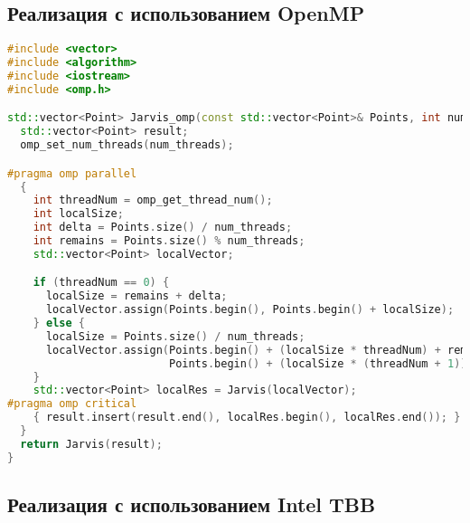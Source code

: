 \documentclass[]{article}
\theoremstyle{remark}
\theoremstyle{definition}
\begin{document}
\subsection{Реализация с использованием OpenMP}

\begin{lstlisting}[language=C++]
#include <vector>
#include <algorithm>
#include <iostream>
#include <omp.h>

std::vector<Point> Jarvis_omp(const std::vector<Point>& Points, int num_threads) {
  std::vector<Point> result;
  omp_set_num_threads(num_threads);

#pragma omp parallel
  {
    int threadNum = omp_get_thread_num();
    int localSize;
    int delta = Points.size() / num_threads;
    int remains = Points.size() % num_threads;
    std::vector<Point> localVector;

    if (threadNum == 0) {
      localSize = remains + delta;
      localVector.assign(Points.begin(), Points.begin() + localSize);
    } else {
      localSize = Points.size() / num_threads;
      localVector.assign(Points.begin() + (localSize * threadNum) + remains,
                         Points.begin() + (localSize * (threadNum + 1)) + remains);
    }
    std::vector<Point> localRes = Jarvis(localVector);
#pragma omp critical
    { result.insert(result.end(), localRes.begin(), localRes.end()); }
  }
  return Jarvis(result);
}

\end{lstlisting}

\subsection{Реализация с использованием Intel TBB}
\end{document}
